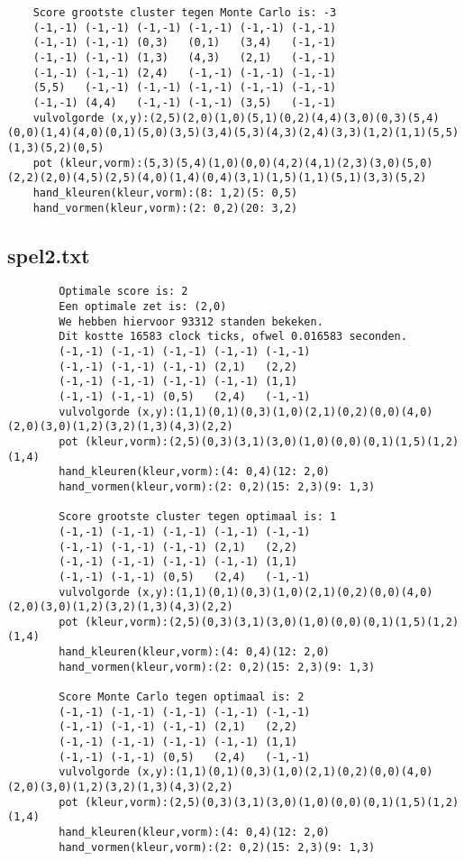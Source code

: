 \documentclass[10pt]{article}
\begin{document}
\begin{appendices}
\begin{lstlisting}
    Score grootste cluster tegen Monte Carlo is: -3
    (-1,-1) (-1,-1) (-1,-1) (-1,-1) (-1,-1) (-1,-1)
    (-1,-1) (-1,-1) (0,3)   (0,1)   (3,4)   (-1,-1)
    (-1,-1) (-1,-1) (1,3)   (4,3)   (2,1)   (-1,-1)
    (-1,-1) (-1,-1) (2,4)   (-1,-1) (-1,-1) (-1,-1)
    (5,5)   (-1,-1) (-1,-1) (-1,-1) (-1,-1) (-1,-1)
    (-1,-1) (4,4)   (-1,-1) (-1,-1) (3,5)   (-1,-1)
    vulvolgorde (x,y):(2,5)(2,0)(1,0)(5,1)(0,2)(4,4)(3,0)(0,3)(5,4)(0,0)(1,4)(4,0)(0,1)(5,0)(3,5)(3,4)(5,3)(4,3)(2,4)(3,3)(1,2)(1,1)(5,5)(1,3)(5,2)(0,5)
    pot (kleur,vorm):(5,3)(5,4)(1,0)(0,0)(4,2)(4,1)(2,3)(3,0)(5,0)(2,2)(2,0)(4,5)(2,5)(4,0)(1,4)(0,4)(3,1)(1,5)(1,1)(5,1)(3,3)(5,2)
    hand_kleuren(kleur,vorm):(8: 1,2)(5: 0,5)
    hand_vormen(kleur,vorm):(2: 0,2)(20: 3,2)
    \end{lstlisting}
    \subsection{spel2.txt}
    \begin{lstlisting}
        Optimale score is: 2
        Een optimale zet is: (2,0)
        We hebben hiervoor 93312 standen bekeken.
        Dit kostte 16583 clock ticks, ofwel 0.016583 seconden.
        (-1,-1) (-1,-1) (-1,-1) (-1,-1) (-1,-1)
        (-1,-1) (-1,-1) (-1,-1) (2,1)   (2,2)
        (-1,-1) (-1,-1) (-1,-1) (-1,-1) (1,1)
        (-1,-1) (-1,-1) (0,5)   (2,4)   (-1,-1)
        vulvolgorde (x,y):(1,1)(0,1)(0,3)(1,0)(2,1)(0,2)(0,0)(4,0)(2,0)(3,0)(1,2)(3,2)(1,3)(4,3)(2,2)
        pot (kleur,vorm):(2,5)(0,3)(3,1)(3,0)(1,0)(0,0)(0,1)(1,5)(1,2)(1,4)
        hand_kleuren(kleur,vorm):(4: 0,4)(12: 2,0)
        hand_vormen(kleur,vorm):(2: 0,2)(15: 2,3)(9: 1,3)

        Score grootste cluster tegen optimaal is: 1
        (-1,-1) (-1,-1) (-1,-1) (-1,-1) (-1,-1)
        (-1,-1) (-1,-1) (-1,-1) (2,1)   (2,2)
        (-1,-1) (-1,-1) (-1,-1) (-1,-1) (1,1)
        (-1,-1) (-1,-1) (0,5)   (2,4)   (-1,-1)
        vulvolgorde (x,y):(1,1)(0,1)(0,3)(1,0)(2,1)(0,2)(0,0)(4,0)(2,0)(3,0)(1,2)(3,2)(1,3)(4,3)(2,2)
        pot (kleur,vorm):(2,5)(0,3)(3,1)(3,0)(1,0)(0,0)(0,1)(1,5)(1,2)(1,4)
        hand_kleuren(kleur,vorm):(4: 0,4)(12: 2,0)
        hand_vormen(kleur,vorm):(2: 0,2)(15: 2,3)(9: 1,3)

        Score Monte Carlo tegen optimaal is: 2
        (-1,-1) (-1,-1) (-1,-1) (-1,-1) (-1,-1)
        (-1,-1) (-1,-1) (-1,-1) (2,1)   (2,2)
        (-1,-1) (-1,-1) (-1,-1) (-1,-1) (1,1)
        (-1,-1) (-1,-1) (0,5)   (2,4)   (-1,-1)
        vulvolgorde (x,y):(1,1)(0,1)(0,3)(1,0)(2,1)(0,2)(0,0)(4,0)(2,0)(3,0)(1,2)(3,2)(1,3)(4,3)(2,2)
        pot (kleur,vorm):(2,5)(0,3)(3,1)(3,0)(1,0)(0,0)(0,1)(1,5)(1,2)(1,4)
        hand_kleuren(kleur,vorm):(4: 0,4)(12: 2,0)
        hand_vormen(kleur,vorm):(2: 0,2)(15: 2,3)(9: 1,3)


\end{lstlisting}
\end{appendices}
\end{document}
